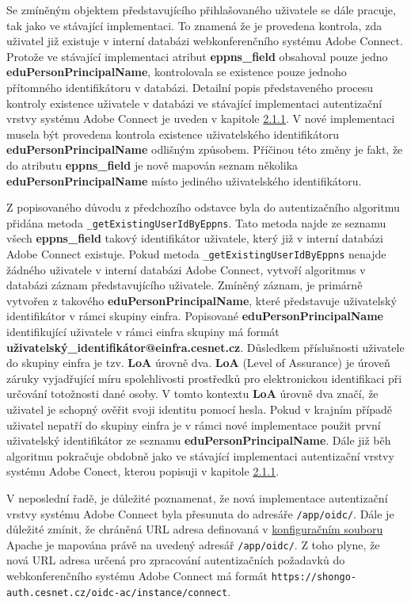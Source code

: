 \documentclass[
  printed, %
  twoside, %
  table,   %
  nolof,     %
  nolot,     %
]{fithesis3}
\begin{document}
Se zmíněným objektem představujícího přihlašovaného uživatele se dále pracuje, tak jako ve stávající implementaci. To znamená že je provedena kontrola, zda uživatel již existuje v interní databázi webkonferenčního systému Adobe Connect. Protože ve stávající implementaci atribut \textbf{eppns\_field} obsahoval pouze jedno \textbf{eduPersonPrincipalName}, kontrolovala se existence pouze jednoho přítomného identifikátoru v databázi. Detailní popis představeného procesu kontroly existence uživatele v databázi ve stávající implementaci autentizační vrstvy systému Adobe Connect je uveden v kapitole \hyperref[ac-old]{2.1.1}. V nové implementaci musela být provedena kontrola existence uživatelského identifikátoru \textbf{eduPersonPrincipalName} odlišným způsobem. Příčinou této změny je fakt, že do atributu \textbf{eppns\_field} je nově mapován seznam několika \textbf{eduPersonPrincipalName} místo jediného uživatelského identifikátoru.
\par
Z popisovaného důvodu z předchozího odstavce byla do autentizačního algoritmu přidána metoda \texttt{\_getExistingUserIdByEppns}. Tato metoda najde ze seznamu všech \textbf{eppns\_field} takový identifikátor uživatele, který již v interní databázi Adobe Connect existuje. Pokud metoda \texttt{\_getExistingUserIdByEppns} nenajde žádného uživatele v interní databázi Adobe Connect, vytvoří algoritmus v databázi záznam představujícího uživatele. Zmíněný záznam, je primárně vytvořen z takového \textbf{eduPersonPrincipalName}, které představuje uživatelský identifikátor v rámci skupiny einfra. Popisované \textbf{eduPersonPrincipalName} identifikující uživatele v rámci einfra skupiny má formát \textbf{{uživatelský\_identifikátor}@einfra.cesnet.cz}. Důsledkem příslušnosti uživatele do skupiny einfra je tzv. \textbf{LoA} úrovně dva. \textbf{LoA} (Level of Assurance) \cite{rfc6711} je úroveň záruky vyjadřující míru spolehlivosti prostředků pro
elektronickou identifikaci při určování totožnosti dané osoby. V tomto kontextu \textbf{LoA} úrovně dva značí, že uživatel je schopný ověřit svoji identitu pomocí hesla.  Pokud v krajním případě uživatel nepatří do skupiny einfra je v rámci nové implementace použit první uživatelský identifikátor ze seznamu \textbf{eduPersonPrincipalName}. Dále již běh algoritmu pokračuje obdobně jako ve stávající implementaci autentizační vrstvy systému Adobe Conect, kterou popisuji v kapitole \hyperref[ac-old]{2.1.1}. 


\par 
V neposlední řadě, je důležité poznamenat, že nová implementace autentizační vrstvy systému Adobe Connect byla přesunuta do adresáře \texttt{/app/oidc/}. Dále je důležité zmínit, že chráněná URL adresa definovaná v \hyperref[ac-location]{konfiguračním souboru} Apache je mapována právě na uvedený adresář \texttt{/app/oidc/}. Z toho plyne, že nová URL adresa určená pro zpracování autentizačních požadavků do webkonferenčního systému Adobe Connect má formát \texttt{https://shongo-auth.cesnet.cz/oidc-ac/instance/connect}.
\end{document}
